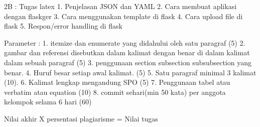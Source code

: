 2B :
Tugas latex
1. Penjelasan JSON dan YAML
2. Cara membuat aplikasi dengan flaskger
3. Cara menggunakan template di flask
4. Cara upload file di flask
5. Respon/error handling di flask



Parameter :
1. itemize dan enumerate yang didahului oleh satu paragraf (5)
2. gambar dan referensi disebutkan dalam kalimat dengan benar di dalam kalimat dalam sebuah paragraf (5)
3. penggunaan section subsection subsubsection yang benar. 
4. Huruf besar setiap awal kalimat. (5)
5. Satu paragraf minimal 3 kalimat (10).
6. Kalimat lengkap mengandung SPO (5)
7. Penggunaan tabel atau verbatim atau equation (10)
8. commit sehari(min 50 kata) per anggota kelompok selama 6 hari (60)

Nilai akhir X persentasi plagiarisme = Nilai tugas


